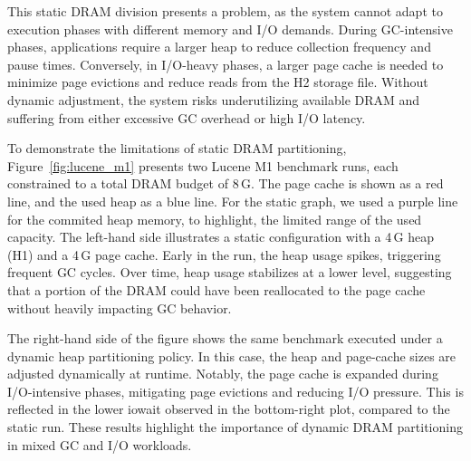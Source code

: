 This static DRAM division presents a problem, as the system cannot adapt to 
execution phases with different memory and I/O demands. During GC-intensive phases,
applications require a larger heap to reduce collection frequency and pause times. 
Conversely, in I/O-heavy phases, a larger page cache is needed to minimize page evictions
and reduce reads from the H2 storage file. Without dynamic adjustment, the system 
risks underutilizing available DRAM and suffering from either excessive GC overhead or high I/O latency.

To demonstrate the limitations of static DRAM partitioning, Figure~\ref{fig:lucene_m1} presents two Lucene 
M1 benchmark runs, each constrained to a total DRAM budget of 8\,G. The page cache is shown as a red line, 
and the used heap as a blue line. For the static graph, we used a purple line for the commited heap memory,
to highlight, the limited range of the used capacity. The left-hand side illustrates a static
configuration with a 4\,G heap (H1) and a 4\,G page cache. Early in the run, the heap usage spikes, triggering 
frequent GC cycles. Over time, heap usage stabilizes at a lower level, suggesting that a portion of the DRAM could 
have been reallocated to the page cache without heavily impacting GC behavior.

The right-hand side of the figure shows the same benchmark executed under a dynamic heap partitioning policy. In this case, 
the heap and page-cache sizes are adjusted dynamically at runtime. Notably, the page cache is expanded 
during I/O-intensive phases, mitigating page evictions and reducing I/O pressure. This is reflected in the 
lower iowait observed in the bottom-right plot, compared to the static run. 
These results highlight the importance of dynamic DRAM partitioning in mixed GC and I/O workloads.


